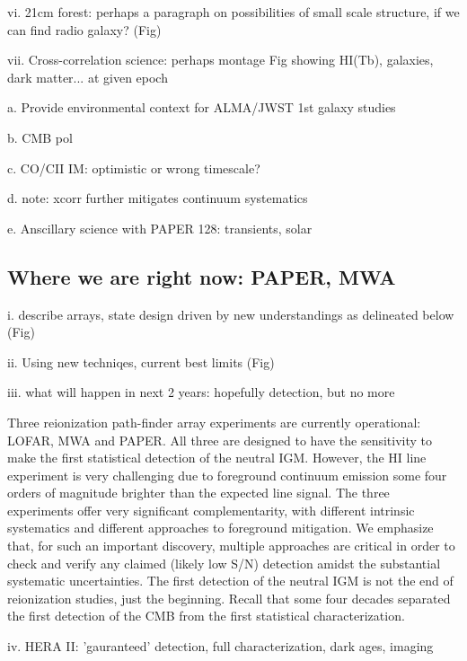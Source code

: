 \documentclass[preprint]{aastex}
\begin{document}
vi. 21cm forest: perhaps a paragraph on possibilities of small scale structure, if we can find radio galaxy? (Fig) 

vii. Cross-correlation science: perhaps montage Fig showing HI(Tb), galaxies, dark matter... at given epoch
\cite{lidz11}

a. Provide environmental context for ALMA/JWST 1st galaxy studies

b. CMB pol 

c. CO/CII IM: optimistic or wrong timescale?
  
d. note: xcorr further mitigates continuum systematics

e. Anscillary science with PAPER 128: transients, solar 

\subsection{Where we are right now: PAPER, MWA}  %

i. describe arrays, state design driven by new understandings as delineated below (Fig)

ii. Using new techniqes, current best limits  (Fig)

iii. what will happen in next 2 years: hopefully detection, but no more

Three reionization path-finder array experiments are currently
operational: LOFAR, MWA and PAPER. All three are designed to have the
sensitivity to make the first statistical detection of the neutral
IGM. However, the HI line experiment is very challenging due to
foreground continuum emission some four orders of magnitude brighter
than the expected line signal.  The three experiments offer very
significant complementarity, with different intrinsic systematics and
different approaches to foreground mitigation. We emphasize that, for
such an important discovery, multiple approaches are critical in order
to check and verify any claimed (likely low S/N) detection amidst the
substantial systematic uncertainties. The first detection of
the neutral IGM is not the end of reionization studies, just the 
beginning. Recall that some four decades separated the first detection
of the CMB from the first statistical characterization. 


iv. HERA II: 'gauranteed' detection, full characterization, dark ages, imaging
\end{document}
